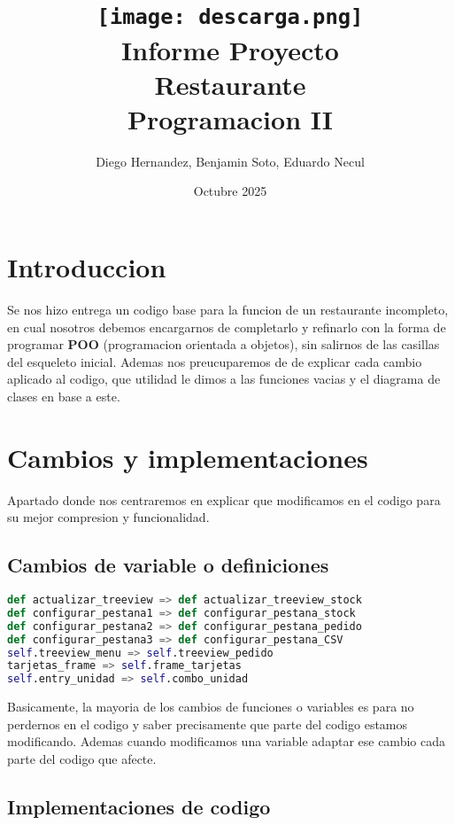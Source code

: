 \documentclass[a4paper,12pt]{article}
\title {\texttt{[image: descarga.png]}\\[2ex]{\textbf{Informe Proyecto\\ Restaurante}\\[1.5ex] Programacion II\\[20ex]}}
\author{Diego Hernandez, Benjamin Soto, Eduardo Necul}
\date{Octubre 2025}
\begin{document}
\maketitle

\newpage
\tableofcontents
\newpage

\section{Introduccion}

Se nos hizo entrega un codigo base para la funcion de un restaurante incompleto, en cual nosotros debemos encargarnos de completarlo y refinarlo con la forma de programar \textbf{POO} (programacion orientada a objetos), sin salirnos de las casillas del esqueleto inicial. Ademas nos preucuparemos de de explicar cada cambio aplicado al codigo, que utilidad le dimos a las funciones vacias y el diagrama de clases en base a este.

\section{Cambios y implementaciones}

Apartado donde nos centraremos en explicar que modificamos en el codigo para su mejor compresion y funcionalidad.

\subsection{Cambios de variable o definiciones}

\begin{lstlisting}[language=Python, caption={Cambios de definiciones o variables}, frame=single]
def actualizar_treeview => def actualizar_treeview_stock
def configurar_pestana1 => def configurar_pestana_stock
def configurar_pestana2 => def configurar_pestana_pedido
def configurar_pestana3 => def configurar_pestana_CSV
self.treeview_menu => self.treeview_pedido
tarjetas_frame => self.frame_tarjetas
self.entry_unidad => self.combo_unidad
\end{lstlisting}

Basicamente, la mayoria de los cambios de funciones o variables es para no perdernos en el codigo y saber precisamente que parte del codigo estamos modificando. Ademas cuando modificamos una variable adaptar ese cambio cada parte del codigo que afecte.

\subsection{Implementaciones de codigo}
\end{document}
